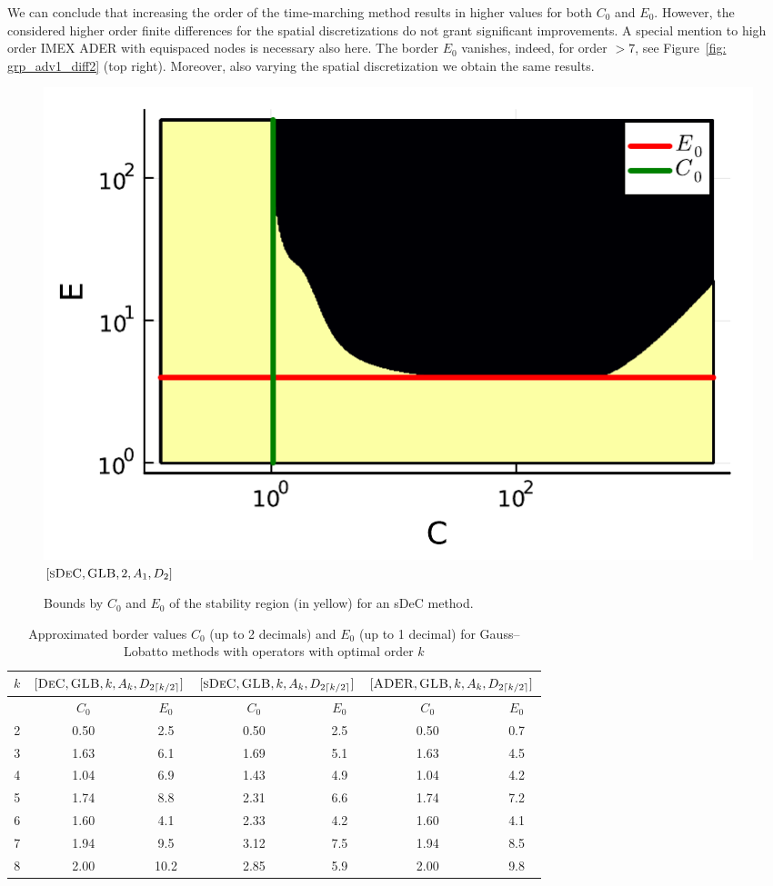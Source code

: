 We can conclude that increasing the order of the time-marching method results in higher values for both $C_0$ and $E_0$. However, the considered higher order finite differences for the spatial discretizations do not grant significant improvements. 
A special mention to high order IMEX ADER with equispaced nodes is necessary also here. The border $E_0$ vanishes, indeed, for order $>7$, see Figure~\ref{fig: grp_adv1_diff2} (top right). Moreover, also varying the spatial discretization we obtain the same results. 
\begin{figure}\centering
	\begin{minipage}[t]{0.45\textwidth}
		\includegraphics[width=\textwidth]{pdf/pdepics/diff/example_IMEXDeC_subtimesteps_gaussLobatto_TMM_ord_2.pdf}
		\centering
		$[\textsc{sDeC},\textsc{GLB}, 2, A_1,D_2]$
	\end{minipage}
	\caption{ Bounds by $C_0$ and $E_0$ of the stability region (in yellow) for an sDeC method.}\label{fig: ADER_eq_adv_diff_stab}
\end{figure}
\begin{table}
	\centering
	\caption{Approximated border values $C_0$ (up to 2 decimals) and $E_0$ (up to 1 decimal) for Gauss--Lobatto methods with operators with optimal order $k$}\label{tab:CE_values}
	\begin{tabular}{|c||c|c||c|c||c|c|}\hline
				$k$&
		\multicolumn{2}{|c||}{$[\textsc{DeC},\textsc{GLB},k,A_k,D_{2\lceil k/2 \rceil}]$}&
		\multicolumn{2}{|c||}{$[\textsc{sDeC},\textsc{GLB},k,A_k,D_{2\lceil k/2 \rceil}]$}&
		\multicolumn{2}{|c|}{$[\textsc{ADER},\textsc{GLB},k,A_k,D_{2\lceil k/2 \rceil}]$}\\\hline
		&$\qquad C_0\qquad$&$E_0$&$\qquad C_0\qquad$&$E_0$&$\qquad C_0\qquad$&$E_0$\\\hline
		2& 0.50 &2.5&0.50&2.5&0.50&0.7\\
		3& 1.63 &6.1&1.69&5.1&1.63&4.5\\
		4& 1.04&6.9&1.43&4.9&1.04&4.2\\
		5& 1.74&8.8&2.31&6.6&1.74&7.2\\
		6& 1.60&4.1&2.33&4.2&1.60&4.1\\
		7& 1.94&9.5&3.12&7.5&1.94&8.5\\
		8&2.00&10.2&2.85&5.9&2.00&9.8\\ \hline
	\end{tabular}
\end{table}



